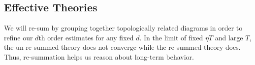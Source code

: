 \documentclass{article}
\theoremstyle{plain}
\newtheorem{cor}{Corollary}
\theoremstyle{definition}
\newcommand{\wrap}[1]{\left(#1\right)}
\newcommand{\sizeddia}[2]{
    \begin{gathered}
        \texttt{[image: ../diagrams/\#1.png]}
    \end{gathered}
}
\newcommand{\sdia}[1]{\protect \sizeddia{#1}{0.10}}
\begin{document}
    

    \subsection{Effective Theories} \label{subsect:effective}
        We will re-sum by grouping together topologically related diagrams in
        order to refine our $d$th order estimates for any fixed $d$. 
        In the limit of fixed $\eta T$ and large $T$, the un-re-summed theory
        does not converge while the re-summed theory does.  Thus, re-summation
        helps us reason about long-term behavior. 
\end{document}
